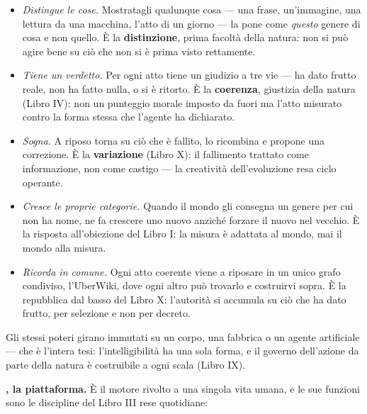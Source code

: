 \begin{itemize}
\item \emph{Distingue le cose.} Mostratagli qualunque cosa --- una frase,
  un'immagine, una lettura da una macchina, l'atto di un giorno --- la pone come
  \emph{questo} genere di cosa e non quello. \`E la \textbf{distinzione}, prima
  facolt\`a della natura: non si pu\`o agire bene su ci\`o che non si \`e prima visto
  rettamente.
\item \emph{Tiene un verdetto.} Per ogni atto tiene un giudizio a tre vie --- ha dato
  frutto reale, non ha fatto nulla, o si \`e ritorto. \`E la \textbf{coerenza},
  giustizia della natura (Libro IV): non un punteggio morale imposto da fuori ma
  l'atto misurato contro la forma stessa che l'agente ha dichiarato.
\item \emph{Sogna.} A riposo torna su ci\`o che \`e fallito, lo ricombina e propone
  una correzione. \`E la \textbf{variazione} (Libro X): il fallimento trattato come
  informazione, non come castigo --- la creativit\`a dell'evoluzione resa ciclo
  operante.
\item \emph{Cresce le proprie categorie.} Quando il mondo gli consegna un genere per
  cui non ha nome, ne fa crescere uno nuovo anzich\'e forzare il nuovo nel vecchio.
  \`E la risposta all'obiezione del Libro I: la misura \`e adattata al mondo, mai il
  mondo alla misura.
\item \emph{Ricorda in comune.} Ogni atto coerente viene a riposare in un unico grafo
  condiviso, l'UberWiki, dove ogni altro pu\`o trovarlo e costruirvi sopra. \`E la
  repubblica dal basso del Libro X: l'autorit\`a si accumula su ci\`o che ha dato
  frutto, per selezione e non per decreto.
\end{itemize}

\noindent Gli stessi poteri girano immutati su un corpo, una fabbrica o un agente
artificiale --- che \`e l'intera tesi: l'intelligibilit\`a ha una sola forma, e il
governo dell'azione da parte della natura \`e costruibile a ogni scala (Libro IX).

\textbf{\praxis, la piattaforma.} \`E il motore rivolto a una singola vita umana, e
le sue funzioni sono le discipline del Libro III rese quotidiane:

